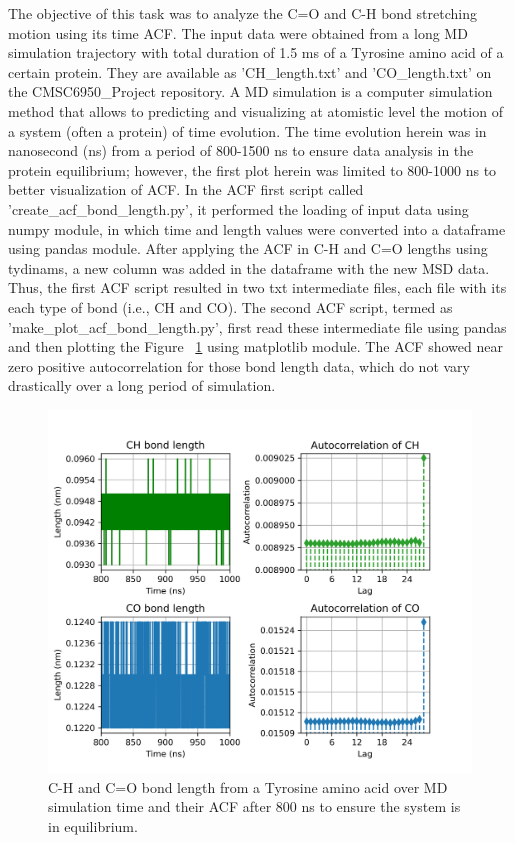 \documentclass{article}
\begin{document}
The objective of this task was to analyze the C=O and C-H bond stretching motion using its time ACF. The input data were obtained from a long MD simulation trajectory with total duration of 1.5 ms of a Tyrosine amino acid of a certain protein. They are available as 'CH_length.txt' and 'CO_length.txt' on the CMSC6950_Project repository. A MD simulation is a computer simulation method that allows to predicting and visualizing at atomistic level the motion of a system (often a protein) of time evolution. The time evolution herein was in nanosecond (ns) from a period of 800-1500 ns to ensure data analysis in the protein equilibrium; however, the first plot herein was limited to 800-1000 ns to better visualization of ACF. In the ACF first script called 'create_acf_bond_length.py', it performed the loading of input data using numpy module, in which time and length values were converted into a dataframe using pandas module. After applying the ACF in C-H and C=O lengths using tydinams, a new column was added in the dataframe with the new MSD data. Thus, the first ACF script resulted in two txt intermediate files, each file with its each type of bond (i.e., CH and CO). The second ACF script, termed as 'make_plot_acf_bond_length.py', first read these intermediate file using pandas and then plotting the Figure ~\ref{fig:acf_plot} using matplotlib module. The ACF showed near zero positive autocorrelation for those bond length data, which do not vary drastically over a long period of simulation.

\begin{figure}[H]
\centering
\includegraphics[width=\linewidth]{CO_CH_length_acf_plot.png}
\caption{C-H and C=O bond length from a Tyrosine amino acid over MD simulation time and their ACF after 800 ns to ensure the system is in equilibrium.}
\label{fig:acf_plot}
\end{figure}
\end{document}
